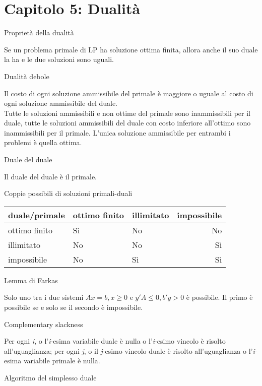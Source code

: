 \documentclass[answers, a4paper, 11pt]{exam}
\begin{document}
\section{Capitolo 5: Dualità}
\begin{questions}
\question Proprietà della dualità
\begin{solution}
Se un problema primale di LP ha soluzione ottima finita, allora anche il suo duale la ha e le due soluzioni sono uguali.
\end{solution}
\question Dualità debole
\begin{solution}
Il costo di ogni soluzione ammissibile del primale è maggiore o uguale al costo di ogni soluzione ammissibile del duale.\\
Tutte le soluzioni ammissibili e non ottime del primale sono inammissibili per il duale, tutte le soluzioni ammissibili del duale con costo inferiore all'ottimo sono inammissibili per il primale. L'unica soluzione ammissibile per entrambi i problemi è quella ottima.
\end{solution}
\question Duale del duale
\begin{solution}
Il duale del duale è il primale.
\end{solution}
\question Coppie possibili di soluzioni primali-duali
\begin{solution}
\begin{tabular}{|l|l|l|r|}
\hline
duale/primale & ottimo finito & illimitato & impossibile\\
\hline
ottimo finito & Sì & No & No\\
\hline
illimitato & No & No & Sì\\
\hline
impossibile & No & Sì & Sì\\
\hline
\end{tabular}
\end{solution}
\question Lemma di Farkas
\begin{solution}
Solo uno tra i due sistemi $Ax=b, x\ge0$ e $y'A\le0, b'y>0$ è possibile. Il primo è possibile se e solo se il secondo è impossibile. 
\end{solution}
\question Complementary slackness
\begin{solution}
Per ogni \emph{i}, o l'\emph{i}-esima variabile duale è nulla o l'\emph{i}-esimo vincolo è risolto all'uguaglianza; per ogni \emph{j}, o il \emph{j}-esimo vincolo duale è risolto all'uguaglianza o l'\emph{i}-esima variabile primale è nulla.  
\end{solution}
\question Algoritmo del simplesso duale
\begin{solution}

\end{solution}
\end{questions}
\end{document}
